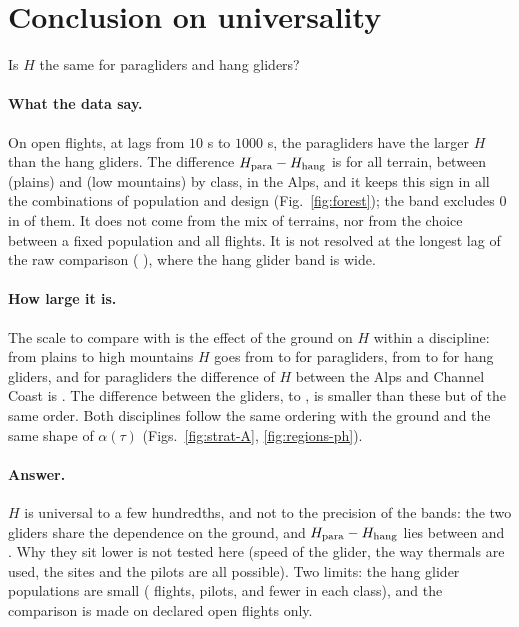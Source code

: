 \section{Conclusion on universality}\label{sec:conclusion}

Is $H$ the same for paragliders and hang gliders?

\paragraph{What the data say.} On open flights, at lags from $10$ s to $1000$ s, the paragliders have the larger $H$ than the
hang gliders. The difference $H_{\mathrm{para}}-H_{\mathrm{hang}}$ is \UniDHAllAfixed{} for all terrain, between \UniDHPlainsAfixed{} (plains) and
\UniDHLowAfixed{} (low mountains) by class, \UniRegDHAlpsAfixed{} in the Alps, and it keeps this sign in all the \UniForestN{}
combinations of population and design (Fig.~\ref{fig:forest}); the band excludes 0 in \UniForestPos{} of them. It does not come from
the mix of terrains, nor from the choice between a fixed population and all flights. It is not resolved at the longest lag
of the raw comparison (\UniDHAllAlongest{} \UniDHBandAllAlongest), where the hang glider band is wide.

\paragraph{How large it is.} The scale to compare with is the effect of the ground on $H$ within a discipline: from plains to high mountains
$H$ goes from \UniHFirstPlainsAfixed{} to \UniHFirstHighAfixed{} for paragliders, from \UniHSecondPlainsAfixed{} to
\UniHSecondHighAfixed{} for hang gliders, and for paragliders the difference of $H$ between the Alps and Channel Coast is \UniBetweenParaDHAlpsChannelAfixed.
The difference between the gliders, \UniForestMin{} to \UniForestMax, is smaller than these but of the same order. Both disciplines
follow the same ordering with the ground and the same shape of $\alpha(\tau)$ (Figs.~\ref{fig:strat-A}, \ref{fig:regions-ph}).

\paragraph{Answer.} $H$ is universal to a few hundredths, and not to the precision of the bands: the two gliders share the dependence
on the ground, and $H_{\mathrm{para}}-H_{\mathrm{hang}}$ lies between \UniForestMin{} and \UniForestMax. Why they sit lower is not tested
here (speed of the glider, the way thermals are used, the sites and the pilots are all possible). Two
limits: the hang glider populations are small (\UniFunnelHangOpen{} flights, \UniFunnelHangPilots{} pilots, and fewer in
each class), and the comparison is made on declared open flights only.

